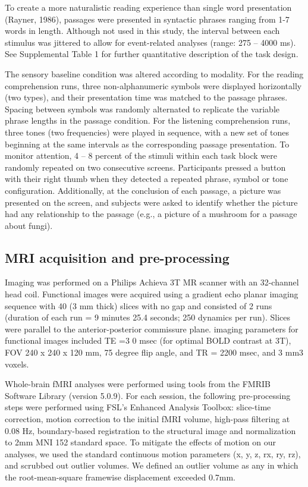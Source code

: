 To create a more naturalistic reading experience than single word presentation (Rayner, 1986), passages were presented in syntactic phrases ranging from 1-7 words in length. Although not used in this study, the interval between each stimulus was jittered to allow for event-related analyses (range: 275 – 4000 ms). See Supplemental Table 1 for further quantitative description of the task design.

The sensory baseline condition was altered according to modality. For the reading comprehension runs, three non-alphanumeric symbols were displayed horizontally (two types), and their presentation time was matched to the passage phrases. Spacing between symbols was randomly alternated to replicate the variable phrase lengths in the passage condition. For the listening comprehension runs, three tones (two frequencies) were played in sequence, with a new set of tones beginning at the same intervals as the corresponding passage presentation. 
To monitor attention, 4 – 8 percent of the stimuli within each task block were randomly repeated on two consecutive screens.  Participants pressed a button with their right thumb when they detected a repeated phrase, symbol or tone configuration. Additionally, at the conclusion of each passage, a picture was presented on the screen, and subjects were asked to identify whether the picture had any relationship to the passage (e.g., a picture of a mushroom for a passage about fungi). 

\subsection{MRI acquisition and pre-processing}

Imaging was performed on a Philips Achieva 3T MR scanner with an 32-channel head coil. Functional images were acquired using a gradient echo planar imaging sequence with 40 (3 mm thick) slices with no gap and consisted of 2 runs (duration of each run = 9 minutes 25.4 seconds; 250 dynamics per run). Slices were parallel to the anterior-posterior commissure plane. imaging parameters for functional images included TE =3 0 msec (for optimal BOLD contrast at 3T), FOV 240 x 240 x 120 mm, 75 degree flip angle, and TR = 2200 msec, and 3 mm3 voxels.

Whole-brain fMRI analyses were performed using tools from the FMRIB Software Library (version 5.0.9). For each session, the following pre-processing steps were performed using FSL’s Enhanced Analysis Toolbox:  slice-time correction, motion correction to the initial fMRI volume, high-pass filtering at 0.08 Hz, boundary-based registration to the structural image and normalization to 2mm MNI 152 standard space. To mitigate the effects of motion on our analyses, we used the standard continuous motion parameters (x, y, z, rx, ry, rz), and scrubbed out outlier volumes. We defined an outlier volume as any in which the root-mean-square framewise displacement exceeded 0.7mm. 

